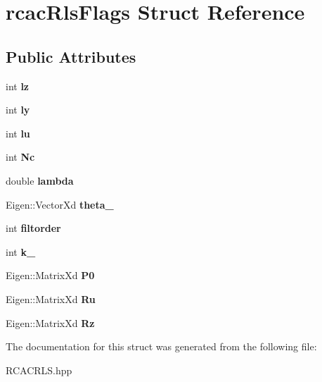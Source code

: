 \hypertarget{structrcac_rls_flags}{}\section{rcac\+Rls\+Flags Struct Reference}
\label{structrcac_rls_flags}
\subsection*{Public Attributes}
\begin{DoxyCompactItemize}
\item 
\mbox{\label{structrcac_rls_flags_a778bf4d0700174efa6deeb624d5bcc09}} 
int {\bfseries lz}
\item 
\mbox{\label{structrcac_rls_flags_a760f93e6bfe4d6669d3671d4f81e814c}} 
int {\bfseries ly}
\item 
\mbox{\label{structrcac_rls_flags_a39f477577e34ebf3d444871495f197a6}} 
int {\bfseries lu}
\item 
\mbox{\label{structrcac_rls_flags_aca7ebde32128866a43a447f34e92928c}} 
int {\bfseries Nc}
\item 
\mbox{\label{structrcac_rls_flags_abe27441b564ecfdf15fa511275742224}} 
double {\bfseries lambda}
\item 
\mbox{\label{structrcac_rls_flags_a8ed42f23cff0f5c333dc453597c0feee}} 
Eigen\+::\+Vector\+Xd {\bfseries theta\+\_}
\item 
\mbox{\label{structrcac_rls_flags_ad1869f6e91f05bb8c80c6559b0c93ac7}} 
int {\bfseries filtorder}
\item 
\mbox{\label{structrcac_rls_flags_a05c788f1af0d4fffffa6aea1be991b0b}} 
int {\bfseries k\+\_}
\item 
\mbox{\label{structrcac_rls_flags_a2eace0273d4c073088e3116c9b2ddcc5}} 
Eigen\+::\+Matrix\+Xd {\bfseries P0}
\item 
\mbox{\label{structrcac_rls_flags_a77b15a161e92da2bdd00e07f6c13e3ba}} 
Eigen\+::\+Matrix\+Xd {\bfseries Ru}
\item 
\mbox{\label{structrcac_rls_flags_aeef4a3ade42d1d937f09dfaa9b8ce5ba}} 
Eigen\+::\+Matrix\+Xd {\bfseries Rz}
\end{DoxyCompactItemize}


The documentation for this struct was generated from the following file\+:\begin{DoxyCompactItemize}
\item 
R\+C\+A\+C\+R\+L\+S.\+hpp\end{DoxyCompactItemize}
